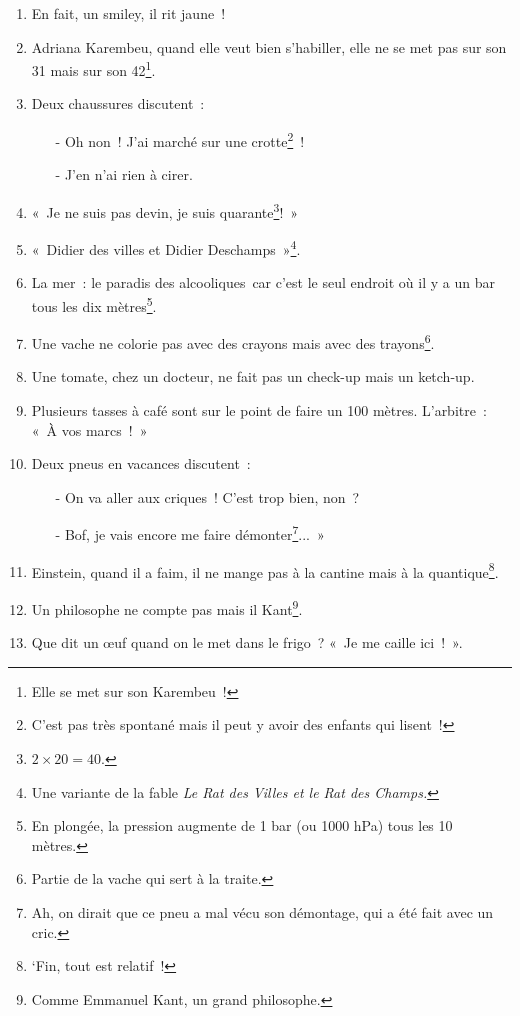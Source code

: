 \documentclass[10pt,a5paper,fullpage]{book}
\begin{document}
\begin{enumerate}
\begin{itemize}
		\end{itemize}			
		\item En fait, un smiley, il rit jaune~!
		\item Adriana Karembeu, quand elle veut bien s’habiller, elle ne se met pas sur son 31 mais sur son 42\footnote{Elle se met sur son Karembeu~!}.
		\item Deux chaussures discutent~:
		\begin{itemize}
			\item[-] Oh non~! J'ai marché sur une crotte\footnote{C'est pas très spontané mais il peut y avoir des enfants qui lisent~!}~! 
			\item[-] J'en n’ai rien à cirer. 
		\end{itemize}
		\item « Je ne suis pas devin, je suis quarante\footnote{$2\times20 = 40$.}!~»
		\item «~Didier des villes et Didier Deschamps~»\footnote{Une variante de la fable \textit{Le Rat des Villes et le Rat des Champs.}}.
		\item La mer~: le paradis des alcooliques car c’est le seul endroit où il y a un bar tous les dix mètres\footnote{En plongée, la pression augmente de 1 bar (ou 1000 hPa) tous les 10 mètres.}.
		\item Une vache ne colorie pas avec des crayons mais avec des trayons\footnote{Partie de la vache qui sert à la traite.}.
		\item Une tomate, chez un docteur, ne fait pas un check-up mais un ketch-up.
		\item Plusieurs tasses à café sont sur le point de faire un 100 mètres. L’arbitre~: «~À vos marcs~!~»
		\item Deux pneus en vacances discutent~:
		\begin{itemize}
			\item[-] On va aller aux criques~! C'est trop bien, non~?
			\item[-] Bof, je vais encore me faire démonter\footnote{Ah, on dirait que ce pneu a mal vécu son démontage, qui a été fait avec un cric.}... »
		\end{itemize}			
		\item Einstein, quand il a faim, il ne mange pas à la cantine mais à la quantique\footnote{‘Fin, tout est relatif~!}.
		\item Un philosophe ne compte pas mais il Kant\footnote{Comme Emmanuel Kant, un grand philosophe.}.
		\item Que dit un \oe{}uf quand on le met dans le frigo~? « Je me caille ici~! ».

\end{enumerate}
\end{document}
